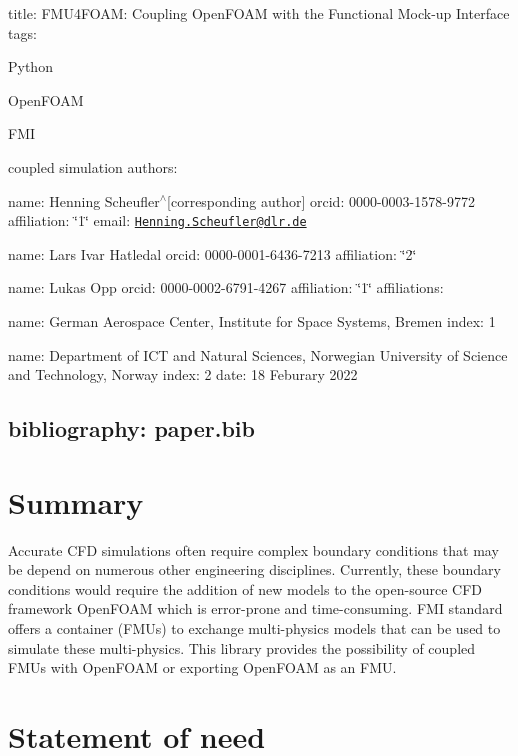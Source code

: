 

 title\+: \textquotesingle{}F\+M\+U4\+F\+O\+AM\+: Coupling Open\+F\+O\+AM with the Functional Mock-\/up Interface\textquotesingle{} tags\+:
\begin{DoxyItemize}
\item Python
\item Open\+F\+O\+AM
\item F\+MI
\item coupled simulation authors\+:
\item name\+: Henning Scheufler$^\wedge$\mbox{[}corresponding author\mbox{]} orcid\+: 0000-\/0003-\/1578-\/9772 affiliation\+: \char`\"{}1\char`\"{} email\+: \href{mailto:Henning.Scheufler@dlr.de}{\tt Henning.\+Scheufler@dlr.\+de}
\item name\+: Lars Ivar Hatledal orcid\+: 0000-\/0001-\/6436-\/7213 affiliation\+: \char`\"{}2\char`\"{}
\item name\+: Lukas Opp orcid\+: 0000-\/0002-\/6791-\/4267 affiliation\+: \char`\"{}1\char`\"{} affiliations\+:
\end{DoxyItemize}

name\+: German Aerospace Center, Institute for Space Systems, Bremen index\+: 1
\begin{DoxyItemize}
\item name\+: Department of I\+CT and Natural Sciences, Norwegian University of Science and Technology, Norway index\+: 2 date\+: 18 Feburary 2022 \subsection*{bibliography\+: paper.\+bib }
\end{DoxyItemize}

\section*{Summary}

Accurate C\+FD simulations often require complex boundary conditions that may be depend on numerous other engineering disciplines. Currently, these boundary conditions would require the addition of new models to the open-\/source C\+FD framework Open\+F\+O\+AM which is error-\/prone and time-\/consuming. F\+MI standard offers a container (F\+M\+Us) to exchange multi-\/physics models that can be used to simulate these multi-\/physics. This library provides the possibility of coupled F\+M\+Us with Open\+F\+O\+AM or exporting Open\+F\+O\+AM as an F\+MU.

\section*{Statement of need}


